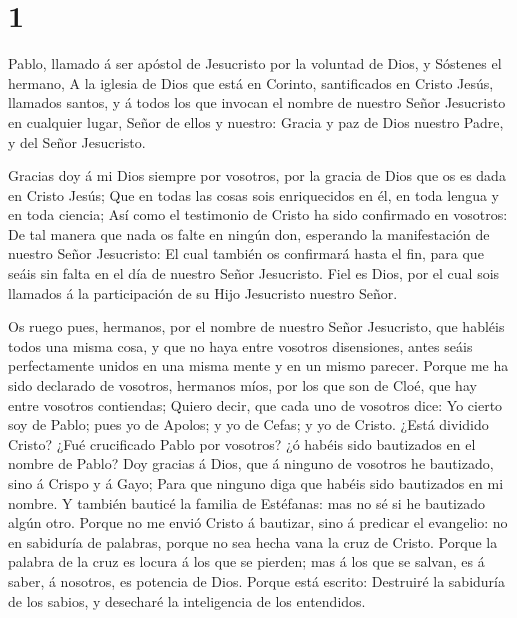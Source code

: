 \hypertarget{section}{%
\section{1}\label{section}}

 Pablo, llamado á ser apóstol de Jesucristo por la voluntad
de Dios, y Sóstenes el hermano,  A la iglesia de Dios que
está en Corinto, santificados en Cristo Jesús, llamados santos, y á
todos los que invocan el nombre de nuestro Señor Jesucristo en cualquier
lugar, Señor de ellos y nuestro:  Gracia y paz de Dios
nuestro Padre, y del Señor Jesucristo.

 Gracias doy á mi Dios siempre por vosotros, por la gracia
de Dios que os es dada en Cristo Jesús;  Que en todas las
cosas sois enriquecidos en él, en toda lengua y en toda ciencia;
 Así como el testimonio de Cristo ha sido confirmado en
vosotros:  De tal manera que nada os falte en ningún don,
esperando la manifestación de nuestro Señor Jesucristo:  El
cual también os confirmará hasta el fin, para que seáis sin falta en el
día de nuestro Señor Jesucristo.  Fiel es Dios, por el cual
sois llamados á la participación de su Hijo Jesucristo nuestro Señor.

 Os ruego pues, hermanos, por el nombre de nuestro Señor
Jesucristo, que habléis todos una misma cosa, y que no haya entre
vosotros disensiones, antes seáis perfectamente unidos en una misma
mente y en un mismo parecer.  Porque me ha sido declarado
de vosotros, hermanos míos, por los que son de Cloé, que hay entre
vosotros contiendas;  Quiero decir, que cada uno de
vosotros dice: Yo cierto soy de Pablo; pues yo de Apolos; y yo de Cefas;
y yo de Cristo.  ¿Está dividido Cristo? ¿Fué crucificado
Pablo por vosotros? ¿ó habéis sido bautizados en el nombre de Pablo?
 Doy gracias á Dios, que á ninguno de vosotros he
bautizado, sino á Crispo y á Gayo;  Para que ninguno diga
que habéis sido bautizados en mi nombre.  Y también bauticé
la familia de Estéfanas: mas no sé si he bautizado algún otro.
 Porque no me envió Cristo á bautizar, sino á predicar el
evangelio: no en sabiduría de palabras, porque no sea hecha vana la cruz
de Cristo.  Porque la palabra de la cruz es locura á los
que se pierden; mas á los que se salvan, es á saber, á nosotros, es
potencia de Dios.  Porque está escrito: Destruiré la
sabiduría de los sabios, y desecharé la inteligencia de los entendidos.

